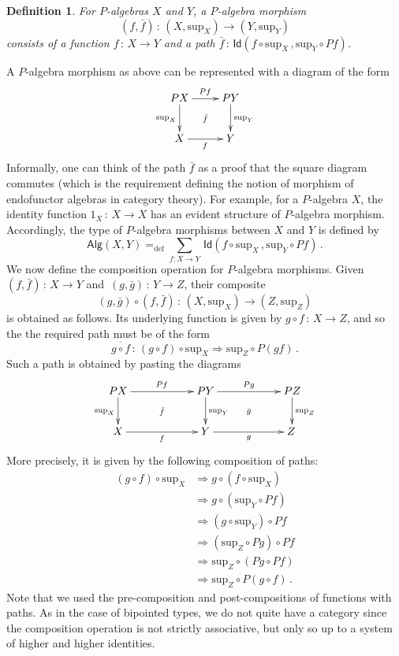\documentclass[10pt,a4paper,oneside,reqno]{amsart}
\theoremstyle{mythm}
\theoremstyle{mydef}
\newtheorem{definition}[theorem]{Definition}
\theoremstyle{myrmk}
\newcommand{\defeq}{=_{\mathrm{def}}}
\newcommand{\co}{\,{:}\,}
\newcommand{\Id}{\mathsf{Id}}
\newcommand{\Palg}{\mathsf{Alg}}
\renewcommand{\sup}{\mathrm{sup}}
\begin{document}
\begin{definition}
For $P$-algebras $X$ and $Y$, a \emph{$P$-algebra morphism}
\[
(f, \bar{f}) \co (X, \sup_X) \rightarrow (Y, \sup_Y)
\]
consists of a function $f \co X \rightarrow Y$ and a path $\bar{f} \co \Id( f \circ \sup_X \, ,  \sup_{Y} \circ P f )$.
\end{definition}

A $P$-algebra morphism as above can be represented with a diagram of the form
\[
\xymatrix{
 PX \ar[d]_{\sup_X} \ar[r]^{Pf}  \ar@{}[dr]|{\bar{f}} &  PY \ar[d]^{\sup_Y}\\
X \ar[r]_{f}   & Y }
\] 
Informally, one can think of the path $\bar{f}$ as a proof that the square diagram commutes (which is the 
requirement defining the notion of morphism of endofunctor algebras in category theory). For example, for a $P$-algebra $X$, 
the identity function $1_X \co X \to X$ has an evident structure of $P$-algebra morphism. Accordingly, the type of $P$-algebra 
morphisms between $X$ and $Y$ is defined by
\[
\Palg(X,Y)
 \defeq  
\sum_{f:  X \rightarrow Y} \, \Id(f\circ \sup_X \, ,  \sup_Y \circ P f )  \, .
\]
We now define the composition operation for $P$-algebra morphisms. Given $(f, \bar{f}) \co X \to Y$ and~$(g, \bar{g}) \co Y \to Z$,
their composite 
\[
(g, \bar{g}) \circ (f, \bar{f}) \co (X, \sup_X) \to (Z, \sup_Z)
\] 
is obtained as follows. Its underlying function is given by $g\circ f\co X \to Z$, and so the 
the required path must be of the form
\[
 \overline{ g \circ f} \co (g\circ f) \circ \sup_X \Rightarrow \sup_Z \circ P(gf)\, .
\]
Such a path is obtained by pasting the diagrams 
\[
\xymatrix@C=2cm{
 PX \ar[d]_{\sup_X} \ar[r]^{Pf}  \ar@{}[dr]|{\bar{f}} &  PY \ar[d]^{\sup_Y}  \ar[r]^{Pg}  \ar@{}[dr]|{\bar{g}} &  PZ \ar[d]^{\sup_Z} \\
X \ar[r]_{f}   & Y \ar[r]_{g}   & Z \,  }
\]
More precisely, it is given by the following composition of paths:
\begin{align*}
(g\circ f) \circ \sup_X &  \Rightarrow g \circ (f \circ \sup_X) \\
 & \Rightarrow g \circ ( \sup_Y \circ P f ) \\
 & \Rightarrow (g \circ \sup_Y) \circ Pf \\
 & \Rightarrow (\sup_Z \circ Pg) \circ Pf \\
 & \Rightarrow \sup_Z \circ (Pg \circ Pf) \\
 & \Rightarrow \sup_Z \circ P (g\circ f) \, .
 \end{align*}
Note that we used the pre-composition and post-compositions of functions with paths. As in the case of bipointed types, we do not quite have a category since the composition operation is not strictly associative, but only so up to a system of higher and higher identities. 
\end{document}
